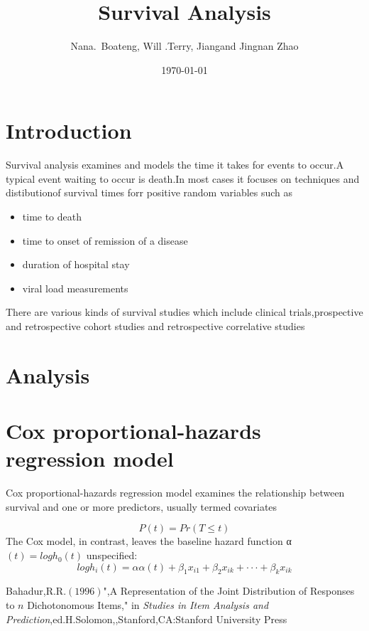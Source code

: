 \documentclass[11pt]{article}
\title{ Survival Analysis}
\author{Nana.~Boateng\footnotemark[1], Will .Terry\footnotemark[2], Jiang\footnotemark[3] and Jingnan
Zhao\footnotemark[7]}
\date{\today}
\begin{document}
\maketitle \thispagestyle{empty}
\begin{abstract}



\end{abstract}



\section{Introduction}
Survival analysis examines and models the time it takes for events to occur.A typical event waiting to occur is death.In most cases it focuses on techniques  and   distibutionof survival times   forr positive random variables such as
\begin{itemize}
\item time to death
\item time to onset of remission of a disease
\item duration of hospital stay
\item viral load measurements
\end{itemize}
There are various kinds of survival studies which include clinical trials,prospective and retrospective cohort  studies and retrospective 
correlative studies
\section{Analysis}

\section{Cox proportional-hazards regression model}
Cox proportional-hazards regression model examines the relationship
between survival and one or more predictors, usually termed covariates


\begin{equation}
P(t) = Pr(T \leq t)
\end{equation}
The Cox model, in contrast, leaves the baseline hazard function α $(t) = log h_{0}(t)$ unspecified:
\begin{equation}
log h_{i}(t) =\alpha α(t) +\beta _{1}x_{i1} + \beta_{2}x_{ik} + · · · + \beta_{k}x_{ik}
\end{equation}
\begin{thebibliography}{100}
Bahadur,R.R.$(1996)$",A  Representation of the Joint Distribution of Responses to $n$ Dichotonomous Items," in \textit{ Studies in Item Analysis and Prediction},ed.H.Solomon,,Stanford,CA:Stanford University Press


\end{thebibliography}
\end{document}
